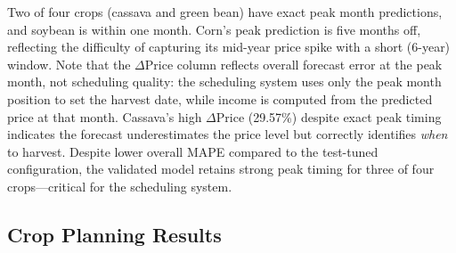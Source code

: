 \documentclass[conference]{IEEEtran}
\begin{document}
Two of four crops (cassava and green bean) have exact peak month predictions, and soybean is within one month. Corn's peak prediction is five months off, reflecting the difficulty of capturing its mid-year price spike with a short (6-year) window. Note that the $\Delta$Price column reflects overall forecast error at the peak month, not scheduling quality: the scheduling system uses only the peak month position to set the harvest date, while income is computed from the predicted price at that month. Cassava's high $\Delta$Price (29.57\%) despite exact peak timing indicates the forecast underestimates the price level but correctly identifies \textit{when} to harvest. Despite lower overall MAPE compared to the test-tuned configuration, the validated model retains strong peak timing for three of four crops---critical for the scheduling system.

\subsection{Crop Planning Results}
\end{document}
